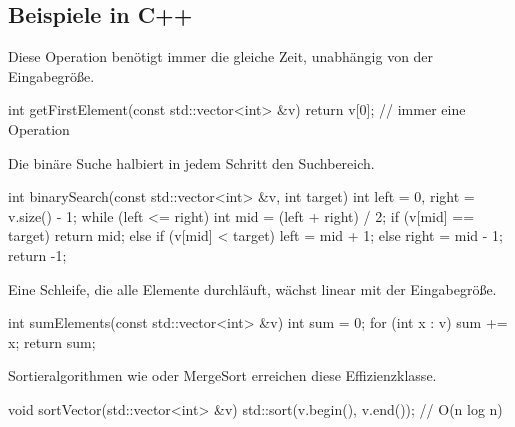 \subsection{Beispiele in C++}

\begin{tcolorbox}[blue, title={Beispiel 1 — konstante Komplexität \rCode{O(1)}}]
    Diese Operation benötigt immer die gleiche Zeit, unabhängig von der Eingabegröße.
\end{tcolorbox}

\begin{cpp}
int getFirstElement(const std::vector<int> &v) {
    return v[0]; // immer eine Operation
}
\end{cpp}

\begin{tcolorbox}[blue, title={Beispiel 2 — logarithmische Komplexität \rCode{$O(\log n)$}}]
    Die binäre Suche halbiert in jedem Schritt den Suchbereich.
\end{tcolorbox}

\begin{cpp}
int binarySearch(const std::vector<int> &v, int target) {
    int left = 0, right = v.size() - 1;
    while (left <= right) {
        int mid = (left + right) / 2;
        if (v[mid] == target) return mid;
        else if (v[mid] < target) left = mid + 1;
        else right = mid - 1;
    }
    return -1;
}
\end{cpp}

\begin{tcolorbox}[blue, title={Beispiel 3 — lineare Komplexität \rCode{O(n)}}]
    Eine Schleife, die alle Elemente durchläuft, wächst linear mit der Eingabegröße.
\end{tcolorbox}

\begin{cpp}
int sumElements(const std::vector<int> &v) {
    int sum = 0;
    for (int x : v) sum += x;
    return sum;
}
\end{cpp}

\begin{tcolorbox}[blue, title={Beispiel 4 — n·log(n) Komplexität \rCode{$O(n \log n)$}}]
    Sortieralgorithmen wie  oder MergeSort erreichen diese Effizienzklasse.
\end{tcolorbox}

\begin{cpp}
void sortVector(std::vector<int> &v) {
    std::sort(v.begin(), v.end()); // O(n log n)
}
\end{cpp}

